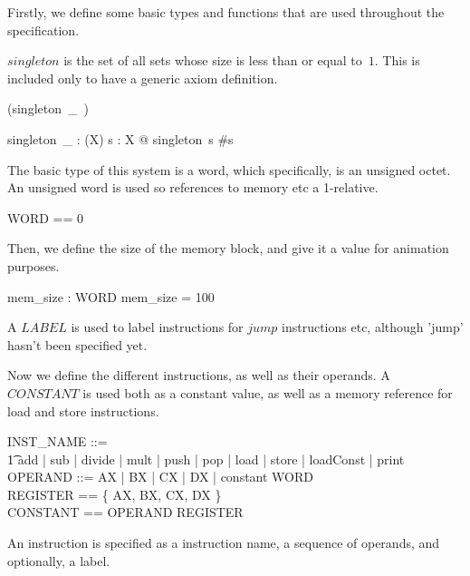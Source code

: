 \documentclass{article}
\begin{document}
Firstly, we define some basic types and functions that are used
throughout the specification.

$singleton$ is the set of all sets whose size is less than or equal to~$1$.
This is included only to have a generic axiom definition.

\begin{zed}
  \relation (singleton~\_~)
\end{zed}

\begin{gendef}[X]
  singleton~\_ : \power (\power X)
\where
  \forall s : \power X @ singleton~s \iff \#s 
\end{gendef}

The basic type of this system is a word, which specifically, is an
unsigned octet. An unsigned word is used so references to memory etc a
1-relative.

\begin{zed}
  WORD == 0 
\end{zed}

Then, we define the size of the memory block, and give it a value for
animation purposes.

\begin{axdef}
  mem\_size : WORD
\where
  mem\_size = 100
\end{axdef}

A $LABEL$ is used to label instructions for $jump$ instructions etc,
although 'jump' hasn't been specified yet.

\begin{zed}
  [LABEL]
\end{zed}

Now we define the different instructions, as well as their operands. A
$CONSTANT$ is used both as a constant value, as well as a memory
reference for load and store instructions.

\begin{zed}
  INST\_NAME ::= \\
    \t1 add | sub | divide | mult | push | pop |
      load | store | loadConst | print \\
  OPERAND ::= AX | BX | CX | DX | constant \ldata WORD \rdata\\
  REGISTER == \{ AX, BX, CX, DX \}\\
  CONSTANT == OPERAND \setminus REGISTER
\end{zed}

An instruction is specified as a instruction name, a sequence of
operands, and optionally, a label.
\end{document}
